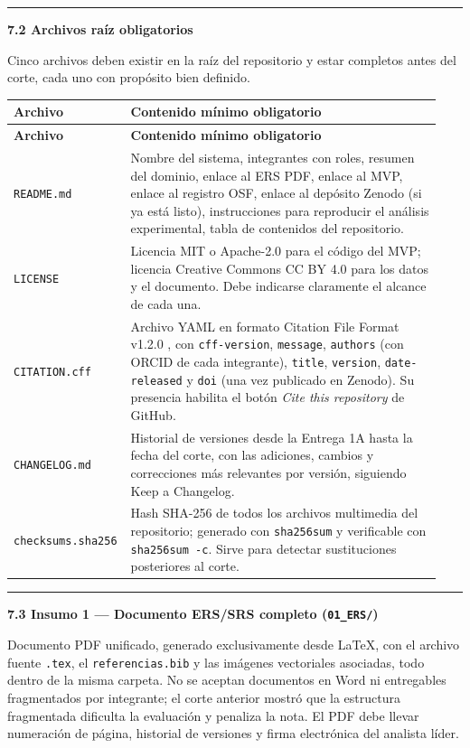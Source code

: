 \documentclass[11pt,a4paper]{article}
\newcommand{\submark}[1]{\par\vspace{4pt}\noindent
    {\color{uteqgreen}\rule[-1pt]{3.5pt}{12pt}}\hspace{6pt}\textbf{\color{uteqgreen}#1}\par\vspace{2pt}}
\newcommand{\hh}[1]{\cellcolor{uteqgreen}\textbf{\color{white}\small #1}}
\begin{document}
\submark{7.2 Archivos raíz obligatorios}
Cinco archivos deben existir en la raíz del repositorio y estar completos antes del corte, cada uno con propósito bien definido.

\begin{longtable}{@{}L{0.22\linewidth} L{0.72\linewidth}@{}}
    \hh{Archivo} & \hh{Contenido mínimo obligatorio}\\
    \endfirsthead
    \hh{Archivo} & \hh{Contenido mínimo obligatorio}\\
    \endhead
    \texttt{README.md} & Nombre del sistema, integrantes con roles, resumen del dominio, enlace al ERS PDF, enlace al MVP, enlace al registro OSF, enlace al depósito Zenodo (si ya está listo), instrucciones para reproducir el análisis experimental, tabla de contenidos del repositorio.\\
    \texttt{LICENSE} & Licencia MIT o Apache-2.0 para el código del MVP; licencia Creative Commons CC BY 4.0 para los datos y el documento. Debe indicarse claramente el alcance de cada una.\\
    \texttt{CITATION.cff} & Archivo YAML en formato Citation File Format v1.2.0 \cite{druskat2021cff}, con \texttt{cff-version}, \texttt{message}, \texttt{authors} (con ORCID de cada integrante), \texttt{title}, \texttt{version}, \texttt{date-released} y \texttt{doi} (una vez publicado en Zenodo). Su presencia habilita el botón \emph{Cite this repository} de GitHub.\\
    \texttt{CHANGELOG.md} & Historial de versiones desde la Entrega 1A hasta la fecha del corte, con las adiciones, cambios y correcciones más relevantes por versión, siguiendo Keep a Changelog.\\
    \texttt{checksums.sha256} & Hash SHA-256 de todos los archivos multimedia del repositorio; generado con \texttt{sha256sum} y verificable con \texttt{sha256sum -c}. Sirve para detectar sustituciones posteriores al corte.\\
\end{longtable}

\submark{7.3 Insumo 1 --- Documento ERS/SRS completo (\texttt{01\_ERS/})}
Documento PDF unificado, generado exclusivamente desde LaTeX, con el archivo fuente \texttt{.tex}, el \texttt{referencias.bib} y las imágenes vectoriales asociadas, todo dentro de la misma carpeta.
No se aceptan documentos en Word ni entregables fragmentados por integrante; el corte anterior mostró que la estructura fragmentada dificulta la evaluación y penaliza la nota.
El PDF debe llevar numeración de página, historial de versiones y firma electrónica del analista líder.
\end{document}
